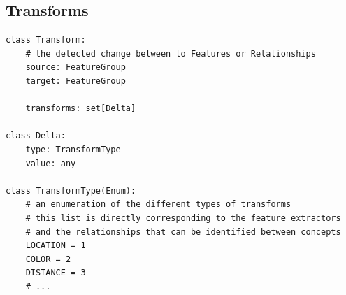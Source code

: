 \documentclass{article}
\begin{document}
\subsection{Transforms}\label{pseudocode:transforms}
\begin{verbatim}
class Transform:
    # the detected change between to Features or Relationships
    source: FeatureGroup
    target: FeatureGroup

    transforms: set[Delta]

class Delta:
    type: TransformType
    value: any

class TransformType(Enum):
    # an enumeration of the different types of transforms
    # this list is directly corresponding to the feature extractors
    # and the relationships that can be identified between concepts
    LOCATION = 1
    COLOR = 2
    DISTANCE = 3
    # ...
\end{verbatim}
\end{document}
